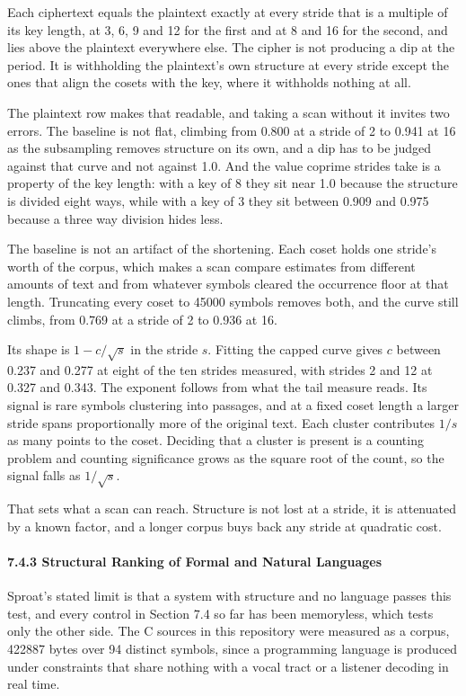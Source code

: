 Each ciphertext equals the plaintext exactly at every stride that is a multiple of its key length, at 3, 6, 9 and 12 for the first and at 8 and 16 for the second, and lies above the plaintext everywhere else. The cipher is not producing a dip at the period. It is withholding the plaintext's own structure at every stride except the ones that align the cosets with the key, where it withholds nothing at all.

The plaintext row makes that readable, and taking a scan without it invites two errors. The baseline is not flat, climbing from 0.800 at a stride of 2 to 0.941 at 16 as the subsampling removes structure on its own, and a dip has to be judged against that curve and not against 1.0. And the value coprime strides take is a property of the key length: with a key of 8 they sit near 1.0 because the structure is divided eight ways, while with a key of 3 they sit between 0.909 and 0.975 because a three way division hides less.

The baseline is not an artifact of the shortening. Each coset holds one stride's worth of the corpus, which makes a scan compare estimates from different amounts of text and from whatever symbols cleared the occurrence floor at that length. Truncating every coset to 45000 symbols removes both, and the curve still climbs, from 0.769 at a stride of 2 to 0.936 at 16.

Its shape is \(1 - c/\sqrt{s}\) in the stride \(s\). Fitting the capped curve gives \(c\) between 0.237 and 0.277 at eight of the ten strides measured, with strides 2 and 12 at 0.327 and 0.343. The exponent follows from what the tail measure reads. Its signal is rare symbols clustering into passages, and at a fixed coset length a larger stride spans proportionally more of the original text. Each cluster contributes \(1/s\) as many points to the coset. Deciding that a cluster is present is a counting problem and counting significance grows as the square root of the count, so the signal falls as \(1/\sqrt{s}\).

That sets what a scan can reach. Structure is not lost at a stride, it is attenuated by a known factor, and a longer corpus buys back any stride at quadratic cost.

\paragraph{7.4.3 Structural Ranking of Formal and Natural Languages}

Sproat's stated limit is that a system with structure and no language passes this test, and every control in Section 7.4 so far has been memoryless, which tests only the other side. The C sources in this repository were measured as a corpus, 422887 bytes over 94 distinct symbols, since a programming language is produced under constraints that share nothing with a vocal tract or a listener decoding in real time.

